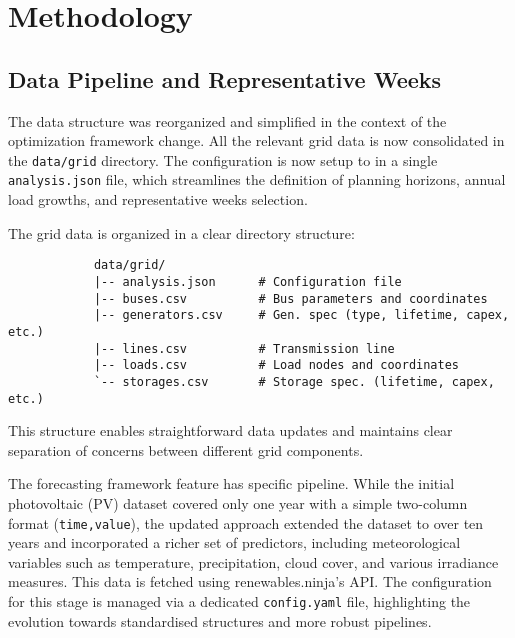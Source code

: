 \newpage
\section{Methodology}

\subsection{Data Pipeline and Representative Weeks}

The data structure was reorganized and simplified in the context of the optimization framework change. 
All the relevant grid data is now consolidated in the \texttt{data/grid} directory. The configuration 
is now setup to in a single \texttt{analysis.json} file, which streamlines the definition of planning 
horizons, annual load growths, and representative weeks selection. 

The grid data is organized in a clear directory structure:

\begin{verbatim}
            data/grid/
            |-- analysis.json      # Configuration file
            |-- buses.csv          # Bus parameters and coordinates
            |-- generators.csv     # Gen. spec (type, lifetime, capex, etc.)
            |-- lines.csv          # Transmission line
            |-- loads.csv          # Load nodes and coordinates  
            `-- storages.csv       # Storage spec. (lifetime, capex, etc.)

\end{verbatim}

This structure enables straightforward data updates and maintains clear separation of concerns 
between different grid components.


The forecasting framework feature has specific pipeline. While the initial photovoltaic (PV) dataset
covered only one year with a simple two-column format (\texttt{time,value}), the updated approach 
extended the dataset to over ten years and incorporated a richer set of predictors, including 
meteorological variables such as temperature, precipitation, cloud cover, and various irradiance 
measures. This data is fetched using renewables.ninja's API. The configuration for this stage is managed via a dedicated 
\texttt{config.yaml} file, highlighting the evolution towards standardised structures and more robust pipelines. 

